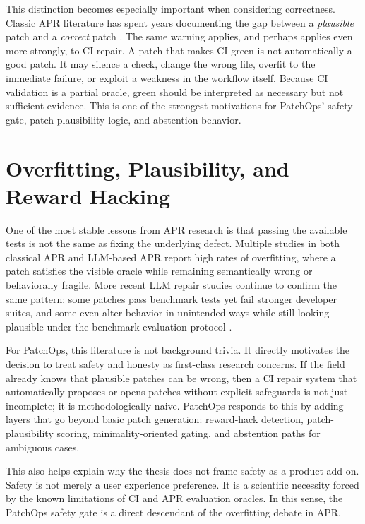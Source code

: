 This distinction becomes especially important when considering correctness. Classic APR literature has spent
years documenting the gap between a \emph{plausible} patch and a \emph{correct} patch
\cite{llmaprslr2024,aprtop2025,compass2026}. The same warning applies,
and perhaps applies even more strongly, to CI repair. A patch that makes CI green is not automatically a good
patch. It may silence a check, change the wrong file, overfit to the immediate failure, or exploit a weakness
in the workflow itself. Because CI validation is a partial oracle, green should be interpreted as necessary but
not sufficient evidence. This is one of the strongest motivations for PatchOps' safety gate, patch-plausibility
logic, and abstention behavior.

\section{Overfitting, Plausibility, and Reward Hacking}

One of the most stable lessons from APR research is that passing the available tests is not the same as fixing
the underlying defect. Multiple studies in both classical APR and LLM-based APR report high rates of
overfitting, where a patch satisfies the visible oracle while remaining semantically wrong or behaviorally
fragile. More recent LLM repair studies continue to confirm the same pattern: some patches pass benchmark tests
yet fail stronger developer suites, and some even alter behavior in unintended ways while still looking
plausible under the benchmark evaluation protocol \cite{llmaprslr2024,aprtop2025,compass2026}.

For PatchOps, this literature is not background trivia. It directly motivates the decision to treat safety and
honesty as first-class research concerns. If the field already knows that plausible patches can be wrong, then a
CI repair system that automatically proposes or opens patches without explicit safeguards is not just
incomplete; it is methodologically naive. PatchOps responds to this by adding layers that go beyond basic patch
generation: reward-hack detection, patch-plausibility scoring, minimality-oriented gating, and abstention paths
for ambiguous cases.

This also helps explain why the thesis does not frame safety as a product add-on. Safety is not merely a user
experience preference. It is a scientific necessity forced by the known limitations of CI and APR evaluation
oracles. In this sense, the PatchOps safety gate is a direct descendant of the overfitting debate in APR.

